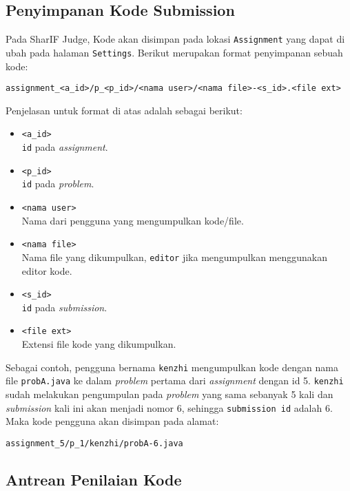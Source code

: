 \subsection{Penyimpanan Kode Submission}
\label{sub:3:1:penyimpanankode}
Pada SharIF Judge, Kode akan disimpan pada lokasi \verb|Assignment| yang dapat di ubah pada halaman \verb|Settings|. Berikut merupakan format penyimpanan sebuah kode:

\begin{center}
      \verb|assignment_<a_id>/p_<p_id>/<nama user>/<nama file>-<s_id>.<file ext>|
\end{center}

Penjelasan untuk format di atas adalah sebagai berikut:

\begin{itemize}
      \item \verb|<a_id>| \\
            \verb|id| pada \textit{assignment}.
      \item \verb|<p_id>| \\
            \verb|id| pada \textit{problem}.
      \item \verb|<nama user>| \\
            Nama dari pengguna yang mengumpulkan kode/file.
      \item \verb|<nama file>| \\
            Nama file yang dikumpulkan, \verb|editor| jika mengumpulkan menggunakan editor kode.
      \item \verb|<s_id>| \\
            \verb|id| pada \textit{submission}.
      \item \verb|<file ext>| \\
            Extensi file kode yang dikumpulkan.
\end{itemize}

Sebagai contoh, pengguna bernama \verb|kenzhi| mengumpulkan kode dengan nama file \verb|probA.java| ke dalam \textit{problem} pertama dari \textit{assignment} dengan id 5. \verb|kenzhi| sudah melakukan pengumpulan pada \textit{problem} yang sama sebanyak 5 kali dan \textit{submission} kali ini akan menjadi nomor 6, sehingga \verb|submission id| adalah 6. Maka kode pengguna akan disimpan pada alamat:

\begin{center}
      \verb|assignment_5/p_1/kenzhi/probA-6.java|
\end{center}

\subsection{Antrean Penilaian Kode}
\label{sub:3:1:antreanpenilaiankode}

